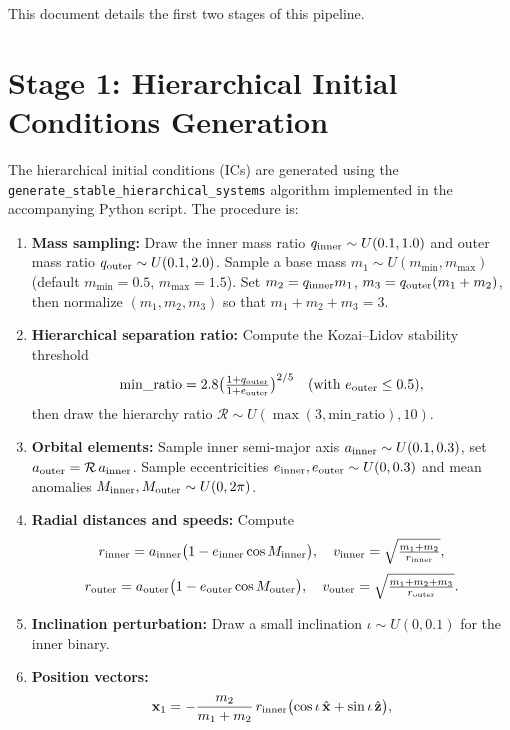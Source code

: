 \documentclass{article}
\begin{document}
This document details the first two stages of this pipeline.


\section*{Stage 1: Hierarchical Initial Conditions Generation}

The hierarchical initial conditions (ICs) are generated using the \texttt{generate\_stable\_hierarchical\_systems} algorithm implemented in the accompanying Python script. The procedure is:

\begin{enumerate}
    \item \textbf{Mass sampling:} Draw the inner mass ratio \(q_{\rm inner}\sim U(0.1,1.0)\) and outer mass ratio \(q_{\rm outer}\sim U(0.1,2.0)\). Sample a base mass \(m_1\sim U(m_{\min},m_{\max})\) (default \(m_{\min}=0.5\), \(m_{\max}=1.5\)). Set \(m_2=q_{\rm inner}m_1\), \(m_3=q_{\rm outer}(m_1+m_2)\), then normalize \((m_1,m_2,m_3)\) so that \(m_1+m_2+m_3=3\).
    \item \textbf{Hierarchical separation ratio:} Compute the Kozai–Lidov stability threshold 
    \[
      \mathrm{min\_ratio} = 2.8\bigl(\tfrac{1+q_{\rm outer}}{1+e_{\rm outer}}\bigr)^{2/5}\quad(\text{with }e_{\rm outer}\le0.5),
    \]
    then draw the hierarchy ratio \(\mathcal{R}\sim U(\max(3,\mathrm{min\_ratio}),10)\).
    \item \textbf{Orbital elements:} Sample inner semi-major axis \(a_{\rm inner}\sim U(0.1,0.3)\), set \(a_{\rm outer}=\mathcal{R}\,a_{\rm inner}\). Sample eccentricities \(e_{\rm inner},e_{\rm outer}\sim U(0,0.3)\) and mean anomalies \(M_{\rm inner},M_{\rm outer}\sim U(0,2\pi)\).
    \item \textbf{Radial distances and speeds:} Compute 
    \[
      r_{\rm inner}=a_{\rm inner}\bigl(1-e_{\rm inner}\cos M_{\rm inner}\bigr),\quad
      v_{\rm inner}=\sqrt{\tfrac{m_1+m_2}{r_{\rm inner}}},
    \]
    \[
      r_{\rm outer}=a_{\rm outer}\bigl(1-e_{\rm outer}\cos M_{\rm outer}\bigr),\quad
      v_{\rm outer}=\sqrt{\tfrac{m_1+m_2+m_3}{r_{\rm outer}}}.
    \]
    \item \textbf{Inclination perturbation:} Draw a small inclination \(\iota\sim U(0,0.1)\) for the inner binary.
    \item \textbf{Position vectors:}
    \begin{align*}
      \mathbf{x}_1 &= -\frac{m_2}{m_1+m_2}\,r_{\rm inner}\bigl(\cos\iota\,\hat{\mathbf{x}}+\sin\iota\,\hat{\mathbf{z}}\bigr),\\

\end{align*}
\end{enumerate}
\end{document}
